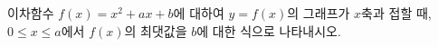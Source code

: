 이차함수 $f(x)=x^2+ax+b$에 대하여 $y=f(x)$의 그래프가 $x$축과 접할 때, $0\le x\le a$에서 $f(x)$의 최댓값을 $b$에 대한 식으로 나타내시오. 
